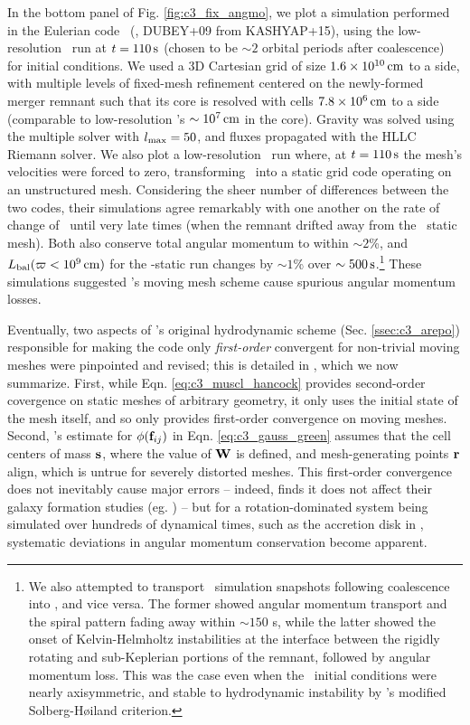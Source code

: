 In the bottom panel of Fig. \ref{fig:c3_fix_angmo}, we plot a simulation performed in the Eulerian code \flash\ (\citealt{fryx+00}, {\charles DUBEY+09 from KASHYAP+15}), using the low-resolution \arepo\ run at $t = 110\,\mathrm{s}$ (chosen to be $\sim2$ orbital periods after coalescence) for initial conditions.  We used a 3D Cartesian grid of size $1.6\times10^{10}\,\mathrm{cm}$ to a side, with multiple levels of fixed-mesh refinement centered on the newly-formed merger remnant such that its core is resolved with cells $7.8\times10^6\,\mathrm{cm}$ to a side (comparable to low-resolution \arepo's $\sim10^7\,\mathrm{cm}$ in the core).  Gravity was solved using the multiple solver with $l_\mathrm{max} = 50$, and fluxes propagated with the HLLC Riemann solver.  We also plot a low-resolution \arepo\ run where, at $t = 110\,\mathrm{s}$ the mesh's velocities were forced to zero, transforming \arepo\ into a static grid code operating on an unstructured mesh.  Considering the sheer number of differences between the two codes, their simulations agree remarkably with one another on the rate of change of \Lzinner\ until very late times (when the remnant drifted away from the \arepo\ static mesh).  {\charles Both also conserve total angular momentum to within $\sim2$\%}, and $\Lbal(\winnercyl)$ for the \arepo-static run changes by $\sim1$\% over $\sim500\,\mathrm{s}$.\footnote{We also attempted to transport \arepo\ simulation snapshots following coalescence into \gasoline, and vice versa.  The former showed angular momentum transport and the spiral pattern fading away within $\sim150$ s, while the latter showed the onset of Kelvin-Helmholtz instabilities at the interface between the rigidly rotating and sub-Keplerian portions of the remnant, followed by angular momentum loss.  This was the case even when the \gasoline\ initial conditions were nearly axisymmetric, and stable to hydrodynamic instability by \cite{maed+13}'s modified Solberg-H{\o}iland criterion.}  These simulations suggested \arepo's moving mesh scheme cause spurious angular momentum losses.

Eventually, two aspects of \arepo's original hydrodynamic scheme (Sec. \ref{ssec:c3_arepo}) responsible for making the code only \textit{first-order} convergent for non-trivial moving meshes were pinpointed and revised; this is detailed in \cite{pakm+15}, which we now summarize.  First, while Eqn. \ref{eq:c3_muscl_hancock} provides second-order covergence on static meshes of arbitrary geometry, it only uses the initial state of the mesh itself, and so only provides first-order convergence on moving meshes.  Second, \arepo's estimate for $\phi({\bf f}_{ij})$ in Eqn. \ref{eq:c3_gauss_green} assumes that the cell centers of mass ${\bf s}$, where the value of ${\bf W}$ is defined, and mesh-generating points ${\bf r}$ align, which is untrue for severely distorted meshes.  This first-order convergence does not inevitably cause major errors -- indeed, \cite{pakm+15} finds it does not affect their galaxy formation studies (eg. \citealt{XXX}) -- but for a rotation-dominated system being simulated over hundreds of dynamical times, such as the accretion disk in \cite{pakm+15}, systematic deviations in angular momentum conservation become apparent.

